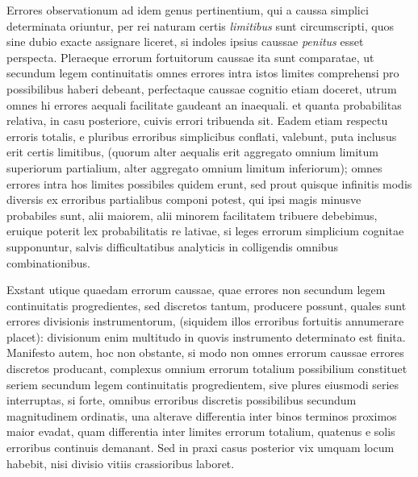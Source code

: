 Errores observationum ad idem genus pertinentium, qui a caussa simplici determinata oriuntur, per rei naturam certis \textit{limitibus} sunt circumscripti, quos sine dubio exacte assignare liceret, si indoles ipsius caussae \textit{penitus} esset perspecta. Pleraeque errorum fortuitorum caussae ita sunt comparatae, ut secundum legem continuitatis omnes errores intra istos limites comprehensi pro possibilibus haberi debeant, perfectaque caussae cognitio etiam doceret, utrum omnes hi errores aequali facilitate gaudeant an inaequali. et quanta probabilitas relativa, in casu posteriore, cuivis errori tribuenda sit. Eadem etiam respectu erroris totalis, e pluribus erroribus simplicibus conflati, valebunt, puta inclusus erit certis limitibus, (quorum alter aequalis erit aggregato omnium limitum superiorum partialium, alter aggregato omnium limitum inferiorum); omnes errores intra hos limites possibiles quidem erunt, sed prout quisque infinitis modis diversis ex erroribus partialibus componi potest, qui ipsi magis minusve probabiles sunt, alii maiorem, alii minorem facilitatem tribuere debebimus, eruique poterit lex probabilitatis re%
lativae, si leges errorum simplicium cognitae supponuntur, salvis difficultatibus analyticis in colligendis omnibus combinationibus.

Exstant utique quaedam errorum caussae, quae errores non secundum legem continuitatis progredientes, sed discretos tantum, producere possunt, quales sunt errores divisionis instrumentorum, (siquidem illos erroribus fortuitis annumerare placet): divisionum enim multitudo in quovis instrumento determinato est finita. Manifesto autem, hoc non obstante, si modo non omnes errorum caussae errores discretos producant, complexus omnium errorum totalium possibilium constituet seriem secundum legem continuitatis progredientem, sive plures eiusmodi series interruptas, si forte, omnibus erroribus discretis possibilibus secundum magnitudinem ordinatis, una alterave differentia inter binos terminos proximos maior evadat, quam differentia inter limites errorum totalium, quatenus e solis erroribus continuis demanant. Sed in praxi casus posterior vix umquam locum habebit, nisi divisio vitiis crassioribus laboret.

